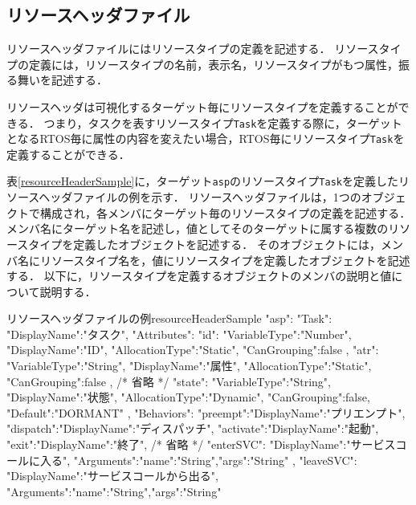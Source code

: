 \subsection{リソースヘッダファイル}
\label{subsec:reshFile}

リソースヘッダファイルにはリソースタイプの定義を記述する．
リソースタイプの定義には，リソースタイプの名前，表示名，リソースタイプがもつ属性，振る舞いを記述する．

リソースヘッダは可視化するターゲット毎にリソースタイプを定義することができる．
つまり，タスクを表すリソースタイプ\verb|Task|を定義する際に，ターゲットとなるRTOS毎に属性の内容を変えたい場合，RTOS毎にリソースタイプ\verb|Task|を定義することができる．

表\ref{resourceHeaderSample}に，ターゲット\verb|asp|のリソースタイプ\verb|Task|を定義したリソースヘッダファイルの例を示す．
リソースヘッダファイルは，1つのオブジェクトで構成され，各メンバにターゲット毎のリソースタイプの定義を記述する．
メンバ名にターゲット名を記述し，値としてそのターゲットに属する複数のリソースタイプを定義したオブジェクトを記述する．
そのオブジェクトには，メンバ名にリソースタイプ名を，値にリソースタイプを定義したオブジェクトを記述する．
以下に，リソースタイプを定義するオブジェクトのメンバの説明と値について説明する．

\begin{File}{リソースヘッダファイルの例}{resourceHeaderSample}
{
  "asp":{
    "Task":{
      "DisplayName":"タスク",
      "Attributes":{
        "id":{
          "VariableType":"Number",
          "DisplayName":"ID",
          "AllocationType":"Static",
          "CanGrouping":false
        },
        "atr":{
          "VariableType":"String",
          "DisplayName":"属性",
          "AllocationType":"Static",
          "CanGrouping":false
        },
        /* 省略 */
        "state":{
          "VariableType":"String",
          "DisplayName":"状態",
          "AllocationType":"Dynamic",
          "CanGrouping":false,
          "Default":"DORMANT"
        }
      },
      "Behaviors":{
        "preempt":{"DisplayName":"プリエンプト"},
        "dispatch":{"DisplayName":"ディスパッチ"},
        "activate":{"DisplayName":"起動"},
        "exit":{"DisplayName":"終了"},
        /* 省略 */
        "enterSVC":{
          "DisplayName":"サービスコールに入る",
          "Arguments":{"name":"String","args":"String"}
        },
        "leaveSVC":{
          "DisplayName":"サービスコールから出る",
          "Arguments":{"name":"String","args":"String"}
        }
      }
    }
  }
}
\end{File}


